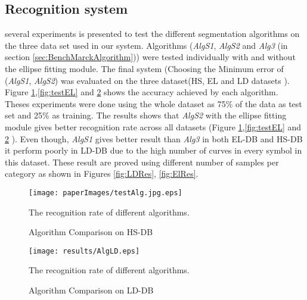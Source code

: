\subsection {Recognition system}
\label{sec:RecognitionAlgorithms}

several experiments is presented to test the different segmentation algorithms on the three data set used in our system. Algorithms (\textsl{AlgS1}, \textsl{AlgS2} and \textsl{Alg3} (in section \ref{sec:BenchMarckAlgorithm})) were tested individually with and without the ellipse fitting module. The final system (Choosing the Minimum error of (\textsl{AlgS1}, \textsl{AlgS2}) was evaluated on the three dataset(HS, EL and LD datasets ). Figure \ref{fig:test1},\ref{fig:testEL} and \ref{fig:testLD} shows the accuracy achieved by each algorithm. Theses experiments were done using the whole dataset as 75\% of the data as test set and 25\% as training. The results shows that \textsl{AlgS2} with the ellipse fitting module gives better recognition rate across all datasets (Figure \ref{fig:test1},\ref{fig:testEL} and \ref{fig:testLD} ). Even though, \textsl{AlgS1} gives better result than \textsl{Alg3} in both EL-DB and HS-DB it perform poorly in LD-DB due to the high number of curves in every symbol in this dataset. These result are proved using different number of samples per category as shown in Figures \ref{fig:LDRes}, \ref{fig:ElRes}. 

\begin{figure}
	\centering		
	 \texttt{[image: paperImages/testAlg.jpg.eps]}
	 	\caption{Algorithm Comparison on HS-DB} The recognition rate of different algorithms. 
	 	\label{fig:test1}
\end{figure} 
\begin{figure}
	\centering		
	 \texttt{[image: results/AlgLD.eps]}
	 	\caption{Algorithm Comparison on LD-DB} The recognition rate of different algorithms. 
	 	\label{fig:testLD}
\end{figure} 

